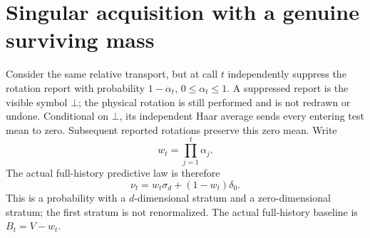 \section{Singular acquisition with a genuine surviving mass}\label{sec:singular}
Consider the same relative transport, but at call $t$ independently suppress the rotation report with probability $1-\alpha_t$, $0\le\alpha_t\le1$. A suppressed report is the visible symbol $\bot$; the physical rotation is still performed and is not redrawn or undone. Conditional on $\bot$, its independent Haar average sends every entering test mean to zero. Subsequent reported rotations preserve this zero mean. Write
\[
 w_t=\prod_{j=1}^t\alpha_j.
\]
The actual full-history predictive law is therefore
\begin{equation}\label{eq:singular-law}
 \nu_t=w_t\sigma_d+(1-w_t)\delta_0.
\end{equation}
This is a probability with a $d$-dimensional stratum and a zero-dimensional stratum; the first stratum is not renormalized. The actual full-history baseline is $B_t=V-w_t$.

